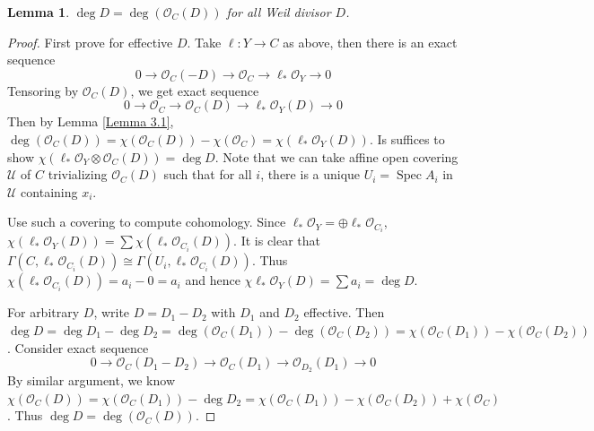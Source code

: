 \documentclass{ctexart}
\newtheorem{lemma}{Lemma}[section]
\newcommand{\spec}{\operatorname{Spec}}
\begin{document}
\begin{lemma}
    $\deg D = \deg (\mathcal{O}_{C}(D))$ for all Weil divisor $D$.
    \label{Lemma 3.4}
\end{lemma}
\begin{proof}
    First prove for effective $D$.
    Take $\ell: Y \rightarrow C$ as above, then there is an exact sequence
    \begin{equation}
        0 \longrightarrow \mathcal{O}_{C}(-D) \longrightarrow \mathcal{O}_{C} \longrightarrow \ell_{\ast}\mathcal{O}_{Y} \longrightarrow 0
    \end{equation}
    Tensoring by $\mathcal{O}_{C}(D)$, we get exact sequence
    \begin{equation}
        0 \longrightarrow \mathcal{O}_{C} \longrightarrow \mathcal{O}_{C}(D) \longrightarrow \ell_{\ast}\mathcal{O}_{Y}(D) \longrightarrow 0
    \end{equation}
    Then by Lemma \ref{Lemma 3.1}, $\deg (\mathcal{O}_{C}(D)) = \chi(\mathcal{O}_{C}(D)) - \chi(\mathcal{O}_{C}) = \chi(\ell_{\ast}\mathcal{O}_{Y}(D))$.
    Is suffices to show $\chi(\ell_{\ast}\mathcal{O}_{Y} \otimes \mathcal{O}_{C}(D)) = \deg D$.
    Note that we can take affine open covering $\mathcal{U}$ of $C$ trivializing $\mathcal{O}_{C}(D)$ such that for all $i$, there is a unique $U_{i} = \spec A_{i}$ in $\mathcal{U}$ containing $x_{i}$.
    \par
    Use such a covering to compute cohomology.
    Since $\ell_{\ast}\mathcal{O}_{Y} = \oplus \ell_{\ast}\mathcal{O}_{C_{i}}$,
    $\chi(\ell_{\ast}\mathcal{O}_{Y}(D)) = \sum \chi(\ell_{\ast}\mathcal{O}_{C_{i}}(D))$.
    It is clear that $\Gamma(C, \ell_{\ast}\mathcal{O}_{C_{i}}(D)) \cong \Gamma(U_{i}, \ell_{\ast}\mathcal{O}_{C_{i}}(D))$.
    Thus $\chi(\ell_{\ast}\mathcal{O}_{C_{i}}(D)) = a_{i} - 0 = a_{i}$ and hence $\chi\ell_{\ast}\mathcal{O}_{Y}(D) = \sum a_{i} = \deg D$.
    \par
    For arbitrary $D$, write $D = D_{1} - D_{2}$ with $D_{1}$ and $D_{2}$ effective.
    Then $\deg D = \deg D_{1} - \deg D_{2} = \deg (\mathcal{O}_{C}(D_{1})) - \deg (\mathcal{O}_{C}(D_{2})) = \chi(\mathcal{O}_{C}(D_{1})) - \chi(\mathcal{O}_{C}(D_{2}))$.
    Consider exact sequence
    \begin{equation}
        0 \longrightarrow \mathcal{O}_{C}(D_{1} - D_{2}) \longrightarrow \mathcal{O}_{C}(D_{1}) \longrightarrow \mathcal{O}_{D_{2}}(D_{1}) \longrightarrow 0
    \end{equation}
    By similar argument, we know $\chi(\mathcal{O}_{C}(D)) = \chi(\mathcal{O}_{C}(D_{1})) - \deg D_{2} = \chi(\mathcal{O}_{C}(D_{1})) - \chi(\mathcal{O}_{C}(D_{2})) + \chi(\mathcal{O}_{C})$.
    Thus $\deg D = \deg (\mathcal{O}_{C}(D))$.
\end{proof}
\end{document}
